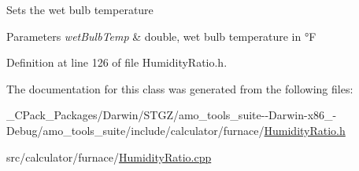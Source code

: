 Sets the wet bulb temperature


\begin{DoxyParams}{Parameters}
{\em wet\+Bulb\+Temp} & double, wet bulb temperature in °F \\
\hline
\end{DoxyParams}


Definition at line 126 of file Humidity\+Ratio.\+h.



The documentation for this class was generated from the following files\+:\begin{DoxyCompactItemize}
\item 
\+\_\+\+C\+Pack\+\_\+\+Packages/\+Darwin/\+S\+T\+G\+Z/amo\+\_\+tools\+\_\+suite-\/-\/\+Darwin-\/x86\+\_-\/\+Debug/amo\+\_\+tools\+\_\+suite/include/calculator/furnace/\hyperlink{___c_pack___packages_2_darwin_2_s_t_g_z_2amo__tools__suite--_darwin-x86__64-_debug_2amo__tools__9140a135d1422db3dc81ed1affc4ef3d}{Humidity\+Ratio.\+h}\item 
src/calculator/furnace/\hyperlink{_humidity_ratio_8cpp}{Humidity\+Ratio.\+cpp}\end{DoxyCompactItemize}
